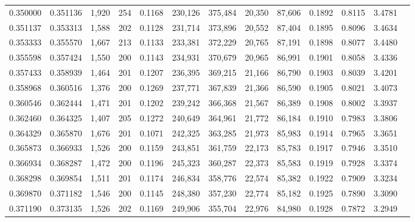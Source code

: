 \begin{tabular}{rrrrrrrrrrrrr}
0.350000 & 0.351136 &  1,920 &   254 &                                     0.1168 & 230,126 & 375,484 &  20,350 &  87,606 & 0.1892 & 0.8115 & 3.4781 \\
0.351137 & 0.353313 &  1,588 &   202 &                                     0.1128 & 231,714 & 373,896 &  20,552 &  87,404 & 0.1895 & 0.8096 & 3.4634 \\
0.353333 & 0.355570 &  1,667 &   213 &                                     0.1133 & 233,381 & 372,229 &  20,765 &  87,191 & 0.1898 & 0.8077 & 3.4480 \\
0.355598 & 0.357424 &  1,550 &   200 &                                     0.1143 & 234,931 & 370,679 &  20,965 &  86,991 & 0.1901 & 0.8058 & 3.4336 \\
0.357433 & 0.358939 &  1,464 &   201 &                                     0.1207 & 236,395 & 369,215 &  21,166 &  86,790 & 0.1903 & 0.8039 & 3.4201 \\
0.358968 & 0.360516 &  1,376 &   200 &                                     0.1269 & 237,771 & 367,839 &  21,366 &  86,590 & 0.1905 & 0.8021 & 3.4073 \\
0.360546 & 0.362444 &  1,471 &   201 &                                     0.1202 & 239,242 & 366,368 &  21,567 &  86,389 & 0.1908 & 0.8002 & 3.3937 \\
0.362460 & 0.364325 &  1,407 &   205 &                                     0.1272 & 240,649 & 364,961 &  21,772 &  86,184 & 0.1910 & 0.7983 & 3.3806 \\
0.364329 & 0.365870 &  1,676 &   201 &                                     0.1071 & 242,325 & 363,285 &  21,973 &  85,983 & 0.1914 & 0.7965 & 3.3651 \\
0.365873 & 0.366933 &  1,526 &   200 &                                     0.1159 & 243,851 & 361,759 &  22,173 &  85,783 & 0.1917 & 0.7946 & 3.3510 \\
0.366934 & 0.368287 &  1,472 &   200 &                                     0.1196 & 245,323 & 360,287 &  22,373 &  85,583 & 0.1919 & 0.7928 & 3.3374 \\
0.368298 & 0.369854 &  1,511 &   201 &                                     0.1174 & 246,834 & 358,776 &  22,574 &  85,382 & 0.1922 & 0.7909 & 3.3234 \\
0.369870 & 0.371182 &  1,546 &   200 &                                     0.1145 & 248,380 & 357,230 &  22,774 &  85,182 & 0.1925 & 0.7890 & 3.3090 \\
0.371190 & 0.373135 &  1,526 &   202 &                                     0.1169 & 249,906 & 355,704 &  22,976 &  84,980 & 0.1928 & 0.7872 & 3.2949 \\

\end{tabular}
